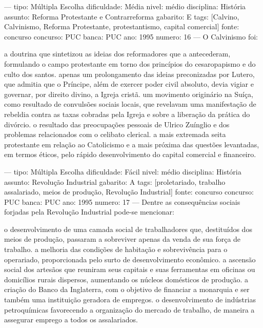 ---
tipo: Múltipla Escolha
dificuldade: Média
nivel: médio
disciplina: História
assunto: Reforma Protestante e Contrarreforma
gabarito: E
tags: [Calvino, Calvinismo, Reforma Protestante, protestantismo, capital comercial]
fonte: concurso
concurso: PUC
banca: PUC
ano: 1995
numero: 16
---
\question
O Calvinismo foi:
\begin{choices}
\choice a doutrina que sintetizou as ideias dos reformadores que a antecederam, formulando o campo protestante em torno dos princípios do cesaropapismo e do culto dos santos.
\choice apenas um prolongamento das ideias preconizadas por Lutero, que admitia que o Príncipe, além de exercer poder civil absoluto, devia vigiar e governar, por direito divino, a Igreja cristã.
\choice um movimento originário na Suíça, como resultado de convulsões sociais locais, que revelavam uma manifestação de rebeldia contra as taxas cobradas pela Igreja e sobre a liberação da prática do divórcio.
\choice o resultado das preocupações pessoais de Ulrico Zuínglio e dos problemas relacionados com o celibato clerical.
\CorrectChoice a mais extremada seita protestante em relação ao Catolicismo e a mais próxima das questões levantadas, em termos éticos, pelo rápido desenvolvimento do capital comercial e financeiro.
\end{choices}

---
tipo: Múltipla Escolha
dificuldade: Fácil
nivel: médio
disciplina: História
assunto: Revolução Industrial
gabarito: A
tags: [proletariado, trabalho assalariado, meios de produção, Revolução Industrial]
fonte: concurso
concurso: PUC
banca: PUC
ano: 1995
numero: 17
---
\question
Dentre as consequências sociais forjadas pela Revolução Industrial pode-se mencionar:
\begin{choices}
\CorrectChoice o desenvolvimento de uma camada social de trabalhadores que, destituídos dos meios de produção, passaram a sobreviver apenas da venda de sua força de trabalho.
\choice a melhoria das condições de habitação e sobrevivência para o operariado, proporcionada pelo surto de desenvolvimento econômico.
\choice a ascensão social dos artesãos que reuniram seus capitais e suas ferramentas em oficinas ou domicílios rurais dispersos, aumentando os núcleos domésticos de produção.
\choice a criação do Banco da Inglaterra, com o objetivo de financiar a monarquia e ser também uma instituição geradora de empregos.
\choice o desenvolvimento de indústrias petroquímicas favorecendo a organização do mercado de trabalho, de maneira a assegurar emprego a todos os assalariados.
\end{choices}

